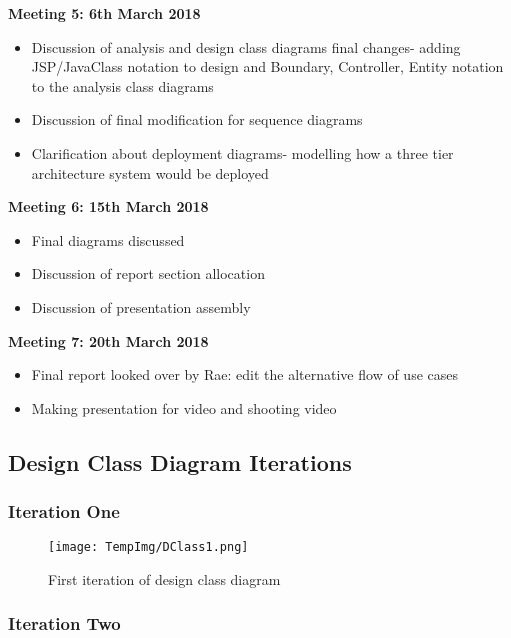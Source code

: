 \documentclass[fontsize=11pt]{extarticle}
\numberwithin{figure}{section} %
\numberwithin{table}{section}%
\begin{document}
\textbf{Meeting 5: 6th March 2018}

\begin{itemize}
	\item Discussion of analysis and design class diagrams final changes- adding JSP/JavaClass notation to design and Boundary, Controller, Entity notation to the analysis class diagrams
	\item Discussion of final modification for sequence diagrams
	\item Clarification about deployment diagrams- modelling how a three tier architecture system would be deployed

\end{itemize}

\textbf{Meeting 6: 15th March 2018}

\begin{itemize}
	\item Final diagrams discussed 
	\item Discussion of report section allocation
	\item Discussion of presentation assembly

\end{itemize}

\textbf{Meeting 7: 20th March 2018}

\begin{itemize}
  \item Final report looked over by Rae: edit the alternative flow of use cases
  \item Making presentation for video and shooting video 

\end{itemize}

\subsection{Design Class Diagram Iterations}


\subsubsection{Iteration One}

\begin{figure}[H]
      \centering
      \texttt{[image: TempImg/DClass1.png]}
      \caption{First iteration of design class diagram}
\end{figure}

\subsubsection{Iteration Two}
\end{document}
